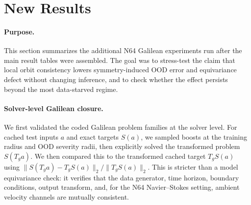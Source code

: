 \section{New Results}
\label{sec:new-results}

\paragraph{Purpose.} This section summarizes the additional N64 Galilean experiments run after the main result tables were assembled. The goal was to stress-test the claim that local orbit consistency lowers symmetry-induced OOD error and equivariance defect without changing inference, and to check whether the effect persists beyond the most data-starved regime.

\paragraph{Solver-level Galilean closure.} We first validated the coded Galilean problem families at the solver level. For cached test inputs \(a\) and exact targets \(S(a)\), we sampled boosts at the training radius and OOD severity radii, then explicitly solved the transformed problem \(S(T_g a)\). We then compared this to the transformed cached target \(T_gS(a)\) using \(\|S(T_g a)-T_gS(a)\|_2/\|T_gS(a)\|_2\). This is stricter than a model equivariance check: it verifies that the data generator, time horizon, boundary conditions, output transform, and, for the N64 Navier--Stokes setting, ambient velocity channels are mutually consistent.

